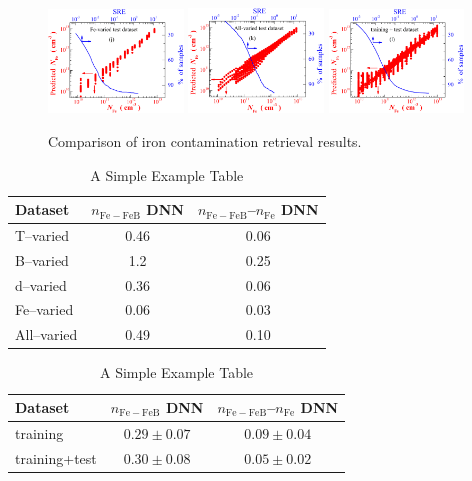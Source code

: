 \documentclass[journal]{IEEEtran}
\begin{document}
\begin{figure}[bt]
\includegraphics[width=0.32\textwidth]{Fig22e}
\includegraphics[width=0.32\textwidth]{Fig22f}
\includegraphics[width=0.32\textwidth]{Fig22g}
\caption{Comparison of iron contamination retrieval results.}
\label{fig_TrPr}
\end{figure}

\begin{table}[!t]
\renewcommand{\arraystretch}{1.3}
\caption{A Simple Example Table}
\label{table_MSRE}
\centering
\begin{tabular}{lcc}
\hline
Dataset & $n_\mathrm{Fe-FeB}$ DNN &$n_\mathrm{Fe-FeB}$--$n_\mathrm{Fe}$ DNN\\
\hline
T--varied&0.46 & 0.06\\
B--varied&1.2 & 0.25\\
d--varied&0.36 & 0.06\\
Fe--varied&0.06 & 0.03\\
All--varied&0.49 & 0.10\\
\hline
\end{tabular}
\end{table}


\begin{table}[!t]
\renewcommand{\arraystretch}{1.3}
\caption{A Simple Example Table}
\label{table_V}
\centering
\begin{tabular}{lcc}
\hline
Dataset & $n_\mathrm{Fe-FeB}$ DNN &$n_\mathrm{Fe-FeB}$--$n_\mathrm{Fe}$ DNN\\
\hline
training&$0.29\pm0.07$&$0.09\pm0.04$ \\
training+test&$0.30\pm0.08$& $0.05\pm0.02$\\
\hline
\end{tabular}
\end{table}
\end{document}
